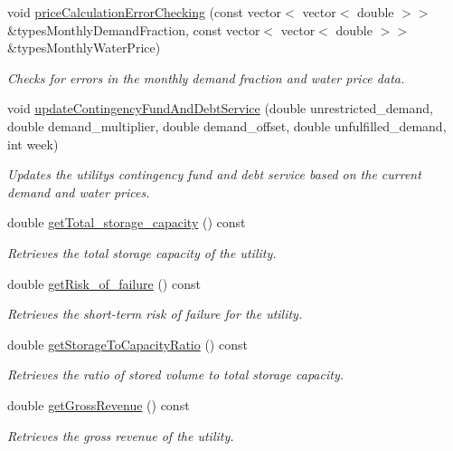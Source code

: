 \begin{DoxyCompactItemize}
void \mbox{\hyperlink{classUtility_a01ec91140b9d23bf5b03e0fc55bced0d}{price\+Calculation\+Error\+Checking}} (const vector$<$ vector$<$ double $>$$>$ \&types\+Monthly\+Demand\+Fraction, const vector$<$ vector$<$ double $>$$>$ \&types\+Monthly\+Water\+Price)
\begin{DoxyCompactList}\small\item\em Checks for errors in the monthly demand fraction and water price data. \end{DoxyCompactList}\item 
void \mbox{\hyperlink{classUtility_ab663efd526505a3d843cae7075cc3b91}{update\+Contingency\+Fund\+And\+Debt\+Service}} (double unrestricted\+\_\+demand, double demand\+\_\+multiplier, double demand\+\_\+offset, double unfulfilled\+\_\+demand, int week)
\begin{DoxyCompactList}\small\item\em Updates the utility\textquotesingle{}s contingency fund and debt service based on the current demand and water prices. \end{DoxyCompactList}\item 
double \mbox{\hyperlink{classUtility_a16f8269dc5f80c1d079c49f33495f620}{get\+Total\+\_\+storage\+\_\+capacity}} () const
\begin{DoxyCompactList}\small\item\em Retrieves the total storage capacity of the utility. \end{DoxyCompactList}\item 
double \mbox{\hyperlink{classUtility_ab43bfbf7db1b5dc2e554a584b19f9e3c}{get\+Risk\+\_\+of\+\_\+failure}} () const
\begin{DoxyCompactList}\small\item\em Retrieves the short-\/term risk of failure for the utility. \end{DoxyCompactList}\item 
double \mbox{\hyperlink{classUtility_a0e27f2877c780e214c6dda06d03246fe}{get\+Storage\+To\+Capacity\+Ratio}} () const
\begin{DoxyCompactList}\small\item\em Retrieves the ratio of stored volume to total storage capacity. \end{DoxyCompactList}\item 
double \mbox{\hyperlink{classUtility_a2903344b317f0949014c687d285b64b6}{get\+Gross\+Revenue}} () const
\begin{DoxyCompactList}\small\item\em Retrieves the gross revenue of the utility. \end{DoxyCompactList}\item 

\end{DoxyCompactItemize}
